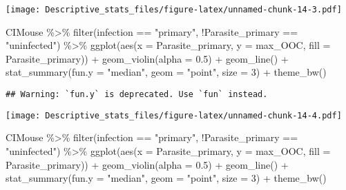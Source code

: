 \documentclass[
]{article}
\newenvironment{Shaded}{\begin{snugshade}}{\end{snugshade}}
\newcommand{\AttributeTok}[1]{\textcolor[rgb]{0.77,0.63,0.00}{#1}}
\newcommand{\DecValTok}[1]{\textcolor[rgb]{0.00,0.00,0.81}{#1}}
\newcommand{\FloatTok}[1]{\textcolor[rgb]{0.00,0.00,0.81}{#1}}
\newcommand{\FunctionTok}[1]{\textcolor[rgb]{0.00,0.00,0.00}{#1}}
\newcommand{\NormalTok}[1]{#1}
\newcommand{\SpecialCharTok}[1]{\textcolor[rgb]{0.00,0.00,0.00}{#1}}
\newcommand{\StringTok}[1]{\textcolor[rgb]{0.31,0.60,0.02}{#1}}
\begin{document}
\texttt{[image: Descriptive\_stats\_files/figure-latex/unnamed-chunk-14-3.pdf]}

\begin{Shaded}
\begin{Highlighting}[]
\NormalTok{CIMouse  }\SpecialCharTok{\%\textgreater{}\%}
    \FunctionTok{filter}\NormalTok{(infection }\SpecialCharTok{==} \StringTok{"primary"}\NormalTok{, }\SpecialCharTok{!}\NormalTok{Parasite\_primary }\SpecialCharTok{==} \StringTok{"uninfected"}\NormalTok{)  }\SpecialCharTok{\%\textgreater{}\%}
  \FunctionTok{ggplot}\NormalTok{(}\FunctionTok{aes}\NormalTok{(}\AttributeTok{x =}\NormalTok{ Parasite\_primary, }\AttributeTok{y =}\NormalTok{ max\_OOC, }\AttributeTok{fill =}\NormalTok{ Parasite\_primary)) }\SpecialCharTok{+}
  \FunctionTok{geom\_violin}\NormalTok{(}\AttributeTok{alpha =} \FloatTok{0.5}\NormalTok{) }\SpecialCharTok{+}
    \FunctionTok{geom\_line}\NormalTok{() }\SpecialCharTok{+}
     \FunctionTok{stat\_summary}\NormalTok{(}\AttributeTok{fun.y =} \StringTok{"median"}\NormalTok{, }\AttributeTok{geom =} \StringTok{"point"}\NormalTok{, }\AttributeTok{size =} \DecValTok{3}\NormalTok{) }\SpecialCharTok{+}
    \FunctionTok{theme\_bw}\NormalTok{() }
\end{Highlighting}
\end{Shaded}

\begin{verbatim}
## Warning: `fun.y` is deprecated. Use `fun` instead.
\end{verbatim}

\texttt{[image: Descriptive\_stats\_files/figure-latex/unnamed-chunk-14-4.pdf]}

\begin{Shaded}
\begin{Highlighting}[]
\NormalTok{CIMouse  }\SpecialCharTok{\%\textgreater{}\%}
    \FunctionTok{filter}\NormalTok{(infection }\SpecialCharTok{==} \StringTok{"primary"}\NormalTok{, }\SpecialCharTok{!}\NormalTok{Parasite\_primary }\SpecialCharTok{==} \StringTok{"uninfected"}\NormalTok{)  }\SpecialCharTok{\%\textgreater{}\%}
  \FunctionTok{ggplot}\NormalTok{(}\FunctionTok{aes}\NormalTok{(}\AttributeTok{x =}\NormalTok{ Parasite\_primary, }\AttributeTok{y =}\NormalTok{ max\_OOC, }\AttributeTok{fill =}\NormalTok{ Parasite\_primary)) }\SpecialCharTok{+}
  \FunctionTok{geom\_violin}\NormalTok{(}\AttributeTok{alpha =} \FloatTok{0.5}\NormalTok{) }\SpecialCharTok{+}
    \FunctionTok{geom\_line}\NormalTok{() }\SpecialCharTok{+}
     \FunctionTok{stat\_summary}\NormalTok{(}\AttributeTok{fun.y =} \StringTok{"median"}\NormalTok{, }\AttributeTok{geom =} \StringTok{"point"}\NormalTok{, }\AttributeTok{size =} \DecValTok{3}\NormalTok{) }\SpecialCharTok{+}
    \FunctionTok{theme\_bw}\NormalTok{() }
\end{Highlighting}
\end{Shaded}
\end{document}
